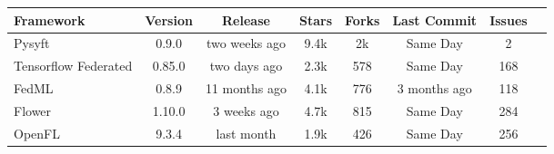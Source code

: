 \begin{changemargin}{0cm}{0cm}
    \centering
    \begin{tabular}{|m{2.4cm}||c|c|c|c|c|c|c|}
        \hline
            \textbf{Framework} & \textbf{Version} & \textbf{Release} & \textbf{Stars} & \textbf{Forks} & \textbf{Last Commit} & \textbf{Issues} \\
        \hline
            Pysyft \cite{fl_framework:pysyft} & 0.9.0 & two weeks ago & 9.4k & 2k & Same Day & 2
        \\
        \hline
            Tensorflow Federated \cite{fl_framework:tensorflow_federated} & 0.85.0 & two days ago & 2.3k & 578 & Same Day & 168
        \\
        \hline
            FedML \cite{fl_framework:fedml} & 0.8.9 & 11 months ago & 4.1k & 776 & 3 months ago & 118
        \\
        \hline
            Flower \cite{fl_framework:flower} & 1.10.0 & 3 weeks ago & 4.7k & 815 & Same Day & 284
        \\
        \hline
            OpenFL \cite{fl_framework:openfl} & 9.3.4 & last month & 1.9k & 426 & Same Day & 256
        \\
        \hline
    \end{tabular}
    \label{table:updated_fl_framework_comparison}
\end{changemargin}
